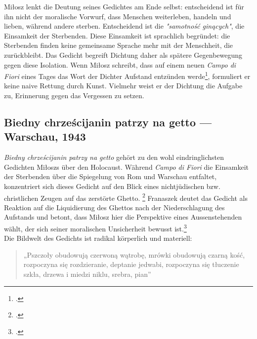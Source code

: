 Miłosz lenkt die Deutung seines Gedichtes am Ende selbst: entscheidend ist für ihn nicht der moralische Vorwurf, dass Menschen weiterleben, handeln und lieben, während andere sterben. Entscheidend ist die \textit{"samotność ginących"}, die Einsamkeit der Sterbenden. Diese Einsamkeit ist sprachlich begründet: die Sterbenden finden keine gemeinsame Sprache mehr mit der Menschheit, die zurückbleibt. Das Gedicht begreift Dichtung daher als spätere Gegenbewegung gegen diese Isolation. Wenn Miłosz schreibt, dass auf einem neuen \textit{Campo di Fiori} eines Tages das Wort der Dichter Aufstand entzünden werde\footcite{fiori-1943}, formuliert er keine naive Rettung durch Kunst. Vielmehr weist er der Dichtung die Aufgabe zu, Erinnerung gegen das Vergessen zu setzen.

\subsection{Biedny chrześcijanin patrzy na getto — Warschau, 1943}

\textit{Biedny chrześcijanin patrzy na getto} gehört zu den wohl eindringlichsten Gedichten Miłoszs über den Holocaust. Während \textit{Campo di Fiori} die Einsamkeit der Sterbenden über die Spiegelung von Rom und Warschau entfaltet, konzentriert sich dieses Gedicht auf den Blick eines nichtjüdischen bzw. christlichen Zeugen auf das zerstörte Ghetto. \footcite{getto-1943} Franaszek deutet das Gedicht als Reaktion auf die Liquidierung des Ghettos nach der Niederschlagung des Aufstands und betont, dass Miłosz hier die Perspektive eines Aussenstehenden wählt, der sich seiner moralischen Unsicherheit bewusst ist.\footcite{franaszek-2017}
\\[6pt]
Die Bildwelt des Gedichts ist radikal körperlich und materiell:

\begin{quote}
  „Pszczoły obudowują czerwoną wątrobę, mrówki obudowują czarną kość, rozpoczyna się rozdzieranie, deptanie jedwabi, rozpoczyna się tłuczenie szkła, drzewa i miedzi niklu, srebra, pian”
\end{quote}

